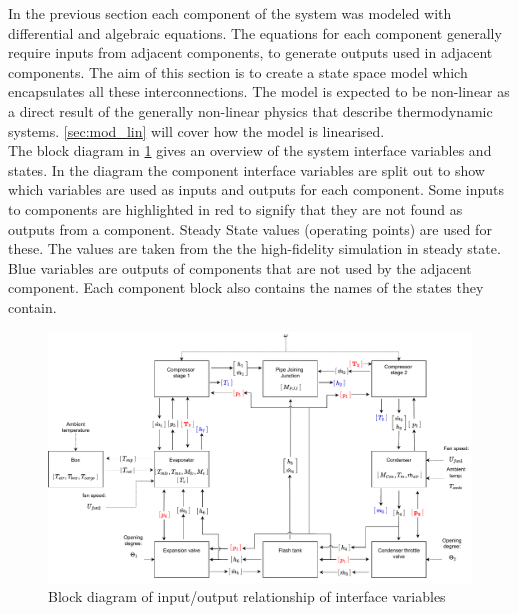 
In the previous section each component of the system was modeled with differential and algebraic equations. The equations for each component generally require inputs from adjacent components, to generate outputs used in adjacent components. The aim of this section is to create a state space model which encapsulates all these interconnections. The model is expected to be non-linear as a direct result of the generally non-linear physics that describe thermodynamic systems. \cref{sec:mod_lin} will cover how the model is linearised.\\

The block diagram in \cref{fig:Block_diagram_inout} gives an overview of the system interface variables and states. In the diagram the component interface variables are split out to show which variables are used as inputs and outputs for each component. Some inputs to components are highlighted in red to signify that they are not found as outputs from a component. Steady State values (operating points) are used for these. The values are taken from the the high-fidelity simulation in steady state. Blue variables are outputs of components that are not used by the adjacent component. Each component block also contains the names of the states they contain.

\begin{figure}[h!]
	\centering
	\includegraphics[width=1\textwidth]{Graphics/Block_Diagram_inout_flowValveVersion.pdf}
	\caption{Block diagram of input/output relationship of interface variables}
	\label{fig:Block_diagram_inout}
\end{figure}

